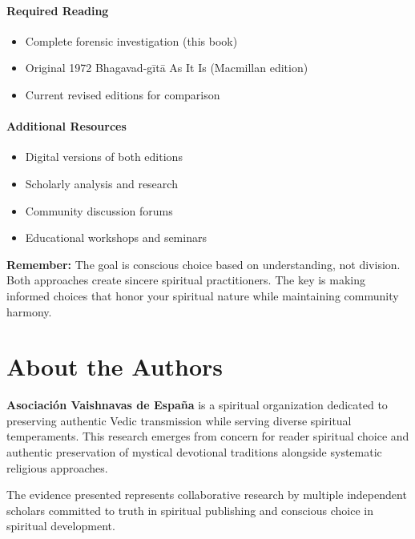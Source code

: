 \documentclass[11pt,twoside]{book}
\begin{document}
\subsubsection*{Required Reading}
\label{sec:orgreading}
\begin{itemize}
\item Complete forensic investigation (this book)
\item Original 1972 Bhagavad-gītā As It Is (Macmillan edition)
\item Current revised editions for comparison
\end{itemize}

\subsubsection*{Additional Resources}
\label{sec:orgadditional}
\begin{itemize}
\item Digital versions of both editions
\item Scholarly analysis and research
\item Community discussion forums
\item Educational workshops and seminars
\end{itemize}

\textbf{Remember:} The goal is conscious choice based on understanding, not division. Both approaches create sincere spiritual practitioners. The key is making informed choices that honor your spiritual nature while maintaining community harmony.

\chapter*{About the Authors}
\label{sec:orgbe216f4}

\textbf{\textbf{Asociación Vaishnavas de España}} is a spiritual organization dedicated to preserving authentic Vedic transmission while serving diverse spiritual temperaments. This research emerges from concern for reader spiritual choice and authentic preservation of mystical devotional traditions alongside systematic religious approaches.

The evidence presented represents collaborative research by multiple independent scholars committed to truth in spiritual publishing and conscious choice in spiritual development.
\end{document}
